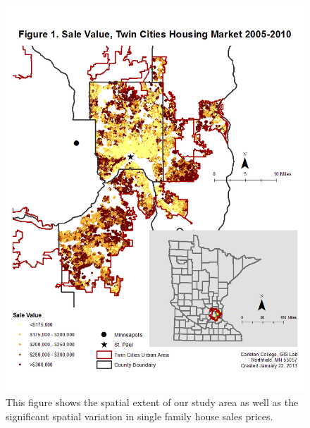 \documentclass{article}\usepackage{graphicx, color}
\begin{document}
\begin{figure}
\includegraphics[width = \textwidth]{../graphs/StudyArea_SaleValueDistribution}
\caption{This figure shows the spatial extent of our study area as well as the significant spatial variation in single family house sales prices.}\label{fig:overview}
\end{figure}
\end{document}

